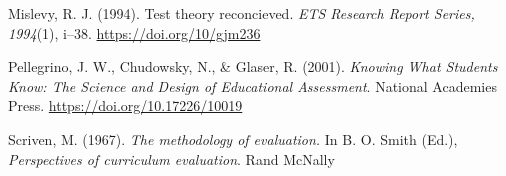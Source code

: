 \documentclass[
]{book}
\begin{document}
Mislevy, R. J. (1994). Test theory reconcieved. \emph{ETS Research Report Series, 1994}(1), i--38. \url{https://doi.org/10/gjm236}

Pellegrino, J. W., Chudowsky, N., \& Glaser, R. (2001). \emph{Knowing What Students Know: The Science and Design of Educational Assessment}. National Academies Press. \url{https://doi.org/10.17226/10019}

Scriven, M. (1967). \emph{The methodology of evaluation.} In B. O. Smith (Ed.), \emph{Perspectives of curriculum evaluation}. Rand McNally

  
\end{document}
